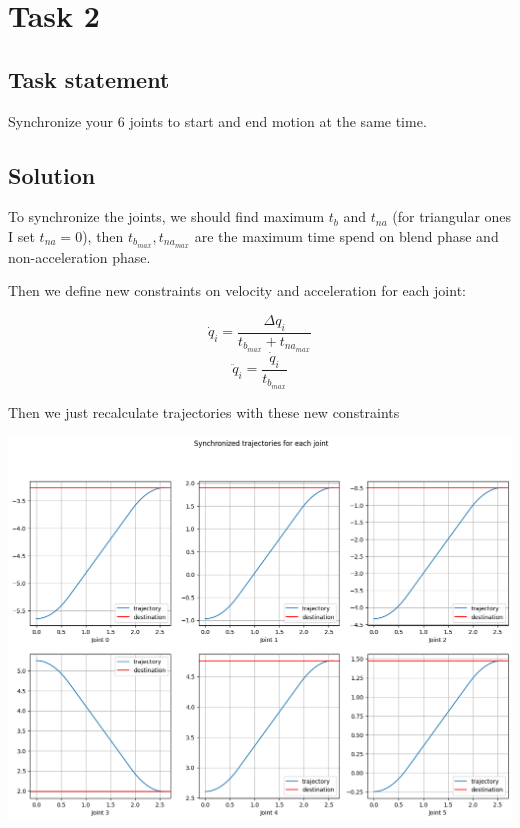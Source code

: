 \section*{Task 2}

\subsection*{Task statement}
Synchronize your 6 joints to start and end motion at the same time.

\subsection*{Solution}

To synchronize the joints, we should find maximum $t_b$ and $t_{na}$ (for triangular ones I set $t_{na} = 0$), then $t_{b_{max}}, t_{na_{max}}$ are the maximum time spend on blend phase and non-acceleration phase.

Then we define new constraints on velocity and acceleration for each joint:

$$\dot q_i = \frac{\Delta q_i}{t_{b_{max}} + t_{na_{max}}}$$
$$\ddot q_i = \frac{\dot q_i}{t_{b_{max}}}$$

Then we just recalculate trajectories with these new constraints

\includegraphics[width=\linewidth]{images/trajectory_synchronized.png}